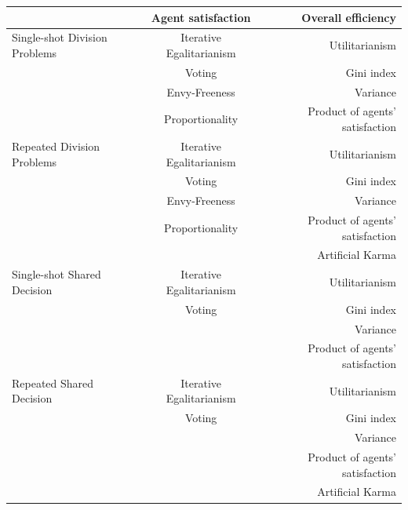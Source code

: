 \documentclass[german, a4paper, 11pt, oneside]{scrbook}
\begin{document}
\begin{center}
\begin{tabular}[h]{l|c|r}
 & Agent satisfaction & Overall efficiency \\
\hline
Single-shot Division Problems & Iterative Egalitarianism & Utilitarianism \\
 & Voting & Gini index \\
 & Envy-Freeness & Variance \\
 & Proportionality & Product of agents' satisfaction \\
\hline
Repeated Division Problems & Iterative Egalitarianism & Utilitarianism \\
 & Voting & Gini index \\
 & Envy-Freeness & Variance \\
& Proportionality & Product of agents' satisfaction\\
& & Artificial Karma\\
\hline
Single-shot Shared Decision & Iterative Egalitarianism & Utilitarianism \\
 & Voting & Gini index \\
  & & Variance \\
& & Product of agents' satisfaction\\

\hline
Repeated Shared Decision & Iterative Egalitarianism & Utilitarianism \\
 & Voting & Gini index \\
 &  & Variance \\
& & Product of agents' satisfaction\\
& & Artificial Karma
\end{tabular}
\end{center}
\end{document}
